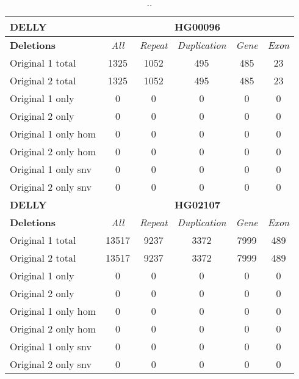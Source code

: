 \begin{table}[htb]
\begin{center}
\begin{tabular}{|l|c||c|c|c|c|}
\hline
{\bf DELLY} & \multicolumn{5}{|c|}{\bf HG00096} \\
\hline
\cline{2-6}
{\bf Deletions} & {\it All} & {\it Repeat} & {\it Duplication} & {\it Gene} & {\it Exon} \\
\hline
Original 1 total & 1325 & 1052 & 495 & 485 & 23\\ 
\hline
Original 2 total & 1325 & 1052 & 495 & 485 & 23\\ 
\hline
Original 1 only & 0 & 0 & 0 & 0 & 0\\ 
\hline
Original 2 only & 0 & 0 & 0 & 0 & 0\\ 
\hline
Original 1 only hom & 0 & 0 & 0 & 0 & 0\\ 
\hline
Original 2 only hom & 0 & 0 & 0 & 0 & 0\\ 
\hline
Original 1 only snv & 0 & 0 & 0 & 0 & 0\\ 
\hline
Original 2 only snv & 0 & 0 & 0 & 0 & 0\\ 
\hline
\hline
{\bf DELLY} & \multicolumn{5}{|c|}{\bf HG02107} \\
\hline
\cline{2-6}
{\bf Deletions} & {\it All} & {\it Repeat} & {\it Duplication} & {\it Gene} & {\it Exon} \\
\hline
Original 1 total & 13517 & 9237 & 3372 & 7999 & 489\\ 
\hline
Original 2 total & 13517 & 9237 & 3372 & 7999 & 489\\ 
\hline
Original 1 only & 0 & 0 & 0 & 0 & 0\\ 
\hline
Original 2 only & 0 & 0 & 0 & 0 & 0\\ 
\hline
Original 1 only hom & 0 & 0 & 0 & 0 & 0\\ 
\hline
Original 2 only hom & 0 & 0 & 0 & 0 & 0\\ 
\hline
Original 1 only snv & 0 & 0 & 0 & 0 & 0\\ 
\hline
Original 2 only snv & 0 & 0 & 0 & 0 & 0\\ 
\hline
\end{tabular}
\end{center}
\caption{ .. }
\label{tab:orig-vs-orig2-delly-deletions}
\end{table}

